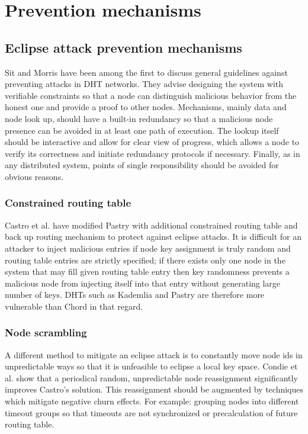 \section{Prevention mechanisms}
\subsection{Eclipse attack prevention mechanisms}

  Sit and Morris \cite{sit02} have been among the first to discuss general
  guidelines against preventing attacks in DHT networks. They advise designing
  the system with verifiable constraints so that a node can distinguish
  malicious behavior from the honest one and provide a proof to other nodes.
  Mechanisms, mainly data and node look up, should have a built-in redundancy so
  that a malicious node presence can be avoided in at least one path of
  execution. The lookup itself should be interactive and allow for clear view of
  progress, which allows a node to verify its correctness and initiate
  redundancy protocols if necessary. Finally, as in any distributed system,
  points of single responsibility should be avoided for obvious reasons.
  
  \subsubsection{Constrained routing table}
  Castro et al. \cite{cas02} have modified Pastry with additional constrained
  routing table and back up routing mechanism to protect against eclipse
  attacks.
  It is difficult for an attacker to inject malicious entries if node key
  assignment is truly random and routing table entries are strictly specified;
  if there exists only one node in the system that may fill given routing table
  entry then key randomness prevents a malicious node from injecting itself into
  that entry without generating large number of keys.
  DHTs such as Kademlia and Pastry are therefore more vulnerable than Chord in
  that regard.

  \subsubsection{Node scrambling}
  A different method to mitigate an eclipse attack is to constantly move node
  ids in unpredictable ways so that it is unfeasible to eclipse a local
  key space. Condie et al. \cite{con06} show that a periodical random,
  unpredictable node reassignment significantly improves Castro's solution.
  This reassignment should be augmented by techniques which mitigate negative
  churn effects. For example: grouping nodes into different timeout groups so
  that timeouts are not synchronized or precalculation of future routing table.

